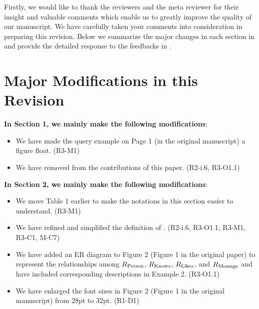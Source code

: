 Firstly, we would like to thank the reviewers and the meta reviewer for their insight and valuable comments which enable us to greatly improve the quality of our manuscript. We have carefully taken your comments into consideration in preparing this revision.
Below we summarize the major changes in each section in  and provide the detailed response to the feedbacks in .


\section{Major Modifications in this Revision}
\label{sec:modifications}

\textbf{In Section 1, we mainly make the following modifications}:
\begin{itemize}
	\item We have made the query example on Page 1 (in the original manuscript) a figure float. (R3-M1)
	\item We have removed \rgmapping from the contributions of this paper. (R2-i.6, R3-O1.1)
\end{itemize}

\textbf{In Section 2, we mainly make the following modifications}:
\begin{itemize}
	\item We move Table 1 earlier to make the notations in this section easier to understand. (R3-M1)
	\item We have refined and simplified the definition of \rgmapping. (R2-i.6, R3-O1.1, R3-M1, R3-C1, M-C7)
	\item We have added an ER diagram to Figure 2 (Figure 1 in the original paper) to represent the relationships among ${R_{\text{Person}}}$,  ${R_{\text{Knows}}}$, ${R_{\text{Likes}}}$, and ${R_{\text{Message}}}$ and have included corresponding descriptions in Example 2. (R3-O1.1)
	\item We have enlarged the font sizes in Figure 2 (Figure 1 in the original manuscript) from 28pt to 32pt. (R1-D1)
\end{itemize}

